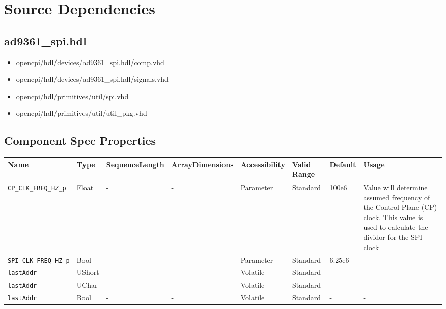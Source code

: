 \documentclass{article}
\def\comp{ad9361\_spi}
\begin{document}
\section*{Source Dependencies}
\subsection*{\comp.hdl}
\begin{itemize}
	\item opencpi/hdl/devices/\comp{}.hdl/comp{}.vhd
	\item opencpi/hdl/devices/\comp{}.hdl/signals.vhd	
	\item opencpi/hdl/primitives/util/spi.vhd
	\item opencpi/hdl/primitives/util/util\_pkg.vhd
\end{itemize}
\begin{landscape}

	\section*{Component Spec Properties}
	\begin{scriptsize}
		\begin{tabular}{|p{3.75cm}|p{1.25cm}|p{2cm}|p{2.75cm}|p{1.5cm}|p{1.5cm}|p{1cm}|p{5.25cm}|}
			\hline
			\rowcolor{blue}
			Name               & Type & SequenceLength & ArrayDimensions & Accessibility      & Valid Range & Default & Usage                                                                               \\
			\hline
			\verb+CP_CLK_FREQ_HZ_p+ & Float & -              & -               & Parameter  & Standard    & 100e6   & Value will determine assumed frequency of the Control Plane (CP) clock. This value is used to calculate the dividor for the SPI clock              \\
			\hline
			\verb+SPI_CLK_FREQ_HZ_p+ & Bool & -              & -               & Parameter & Standard    & 6.25e6  & - \\
			\hline
			\verb+lastAddr+ & UShort & -              & -               & Volatile & Standard    & - & - \\
			\hline
			\verb+lastAddr+ & UChar & -              & -               & Volatile & Standard    & - & - \\
			\hline
			\verb+lastAddr+ & Bool & -              & -               & Volatile & Standard    & - & - \\
			\hline
		\end{tabular}
	\end{scriptsize}


\end{landscape}
\end{document}
